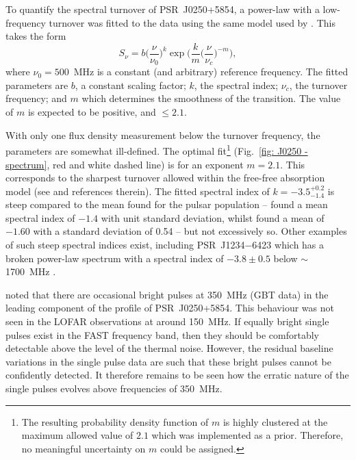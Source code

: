 To quantify the spectral turnover of PSR~J0250+5854, a power-law with a low-frequency turnover was fitted to the data using the same model used by \citet{JSK+2018}. This takes the form
\begin{equation}
\label{eq: J0250 - spectrum}
    S_\nu = b \bigg(\frac{\nu}{\nu_0}\bigg)^k \exp\bigg( \frac{k}{m} \bigg(\frac{\nu}{\nu_c}\bigg)^{-m}\bigg),
\end{equation}
where $\nu_0 = 500$~MHz is a constant (and arbitrary) reference frequency. The fitted parameters are $b$, a constant scaling factor; $k$, the spectral index; $\nu_c$, the turnover frequency; and $m$ which determines the smoothness of the transition. The value of $m$ is expected to be positive, and $\leq2.1$.

With only one flux density measurement below the turnover frequency, the parameters are somewhat ill-defined. The optimal fit\footnote{The resulting probability density function of $m$ is highly clustered at the maximum allowed value of $2.1$ which was implemented as a prior. Therefore, no meaningful uncertainty on $m$ could be assigned.} (Fig.~\ref{fig: J0250 - spectrum}, red and white dashed line) is for an exponent $m=2.1$. This corresponds to the sharpest turnover allowed within the free-free absorption model (see \citet{JSK+2018} and references therein). The fitted spectral index of $k = -3.5^{+0.2}_{-1.4}$ is steep compared to the mean found for the pulsar population -- \citet{BLVx2013} found a mean spectral index of $-1.4$ with unit standard deviation, whilst \citet{JSK+2018} found a mean of $-1.60$ with a standard deviation of 0.54 -- but not excessively so. Other examples of such steep spectral indices exist, including PSR~J1234$-$6423 which has a broken power-law spectrum with a spectral index of $-3.8\pm0.5$ below $\sim$1700~MHz \citep{JSK+2018}.

\citet{TBC+2018} noted that there are occasional bright pulses at 350~MHz (GBT data) in the leading component of the profile of PSR~J0250+5854. This behaviour was not seen in the LOFAR observations at around 150~MHz. If equally bright single pulses exist in the FAST frequency band, then they should be comfortably detectable above the level of the thermal noise. However, the residual baseline variations in the single pulse data are such that these bright pulses cannot be confidently detected. It therefore remains to be seen how the erratic nature of the single pulses evolves above frequencies of 350~MHz.











